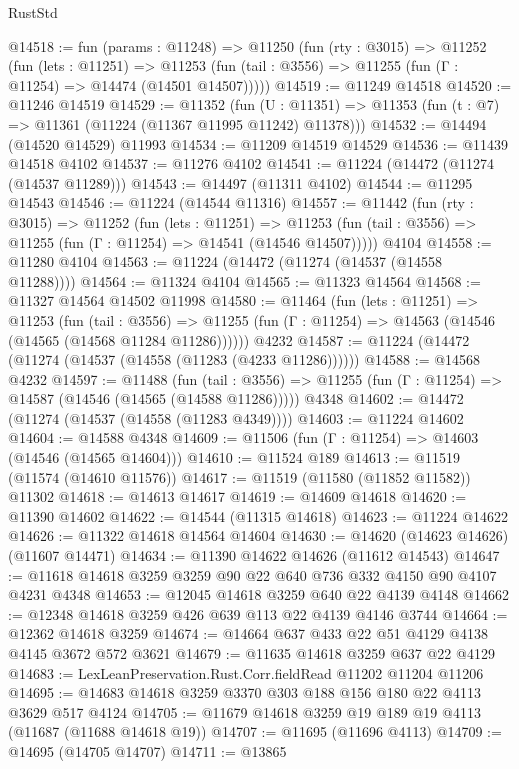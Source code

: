 \begin{lexlean}{RustStd}
\begin{coremodule}
@14518 := fun (params : @11248) =>
  @11250
    (fun (rty : @3015) =>
    @11252
      (fun (lets : @11251) =>
      @11253 (fun (tail : @3556) => @11255 (fun (Γ : @11254) => @14474 (@14501 @14507)))))
@14519 := @11249 @14518
@14520 := @11246 @14519
@14529 := @11352
    (fun (U : @11351) => @11353 (fun (t : @7) => @11361 (@11224 (@11367 @11995 @11242) @11378)))
@14532 := @14494 (@14520 @14529) @11993
@14534 := @11209 @14519 @14529
@14536 := @11439 @14518 @4102
@14537 := @11276 @4102
@14541 := @11224 (@14472 (@11274 (@14537 @11289)))
@14543 := @14497 (@11311 @4102)
@14544 := @11295 @14543
@14546 := @11224 (@14544 @11316)
@14557 := @11442
    (fun (rty : @3015) =>
    @11252
      (fun (lets : @11251) =>
      @11253 (fun (tail : @3556) => @11255 (fun (Γ : @11254) => @14541 (@14546 @14507)))))
    @4104
@14558 := @11280 @4104
@14563 := @11224 (@14472 (@11274 (@14537 (@14558 @11288))))
@14564 := @11324 @4104
@14565 := @11323 @14564
@14568 := @11327 @14564 @14502 @11998
@14580 := @11464
    (fun (lets : @11251) =>
    @11253
      (fun (tail : @3556) =>
      @11255 (fun (Γ : @11254) => @14563 (@14546 (@14565 (@14568 @11284 @11286))))))
    @4232
@14587 := @11224 (@14472 (@11274 (@14537 (@14558 (@11283 (@4233 @11286))))))
@14588 := @14568 @4232
@14597 := @11488
    (fun (tail : @3556) => @11255 (fun (Γ : @11254) => @14587 (@14546 (@14565 (@14588 @11286)))))
    @4348
@14602 := @14472 (@11274 (@14537 (@14558 (@11283 @4349))))
@14603 := @11224 @14602
@14604 := @14588 @4348
@14609 := @11506 (fun (Γ : @11254) => @14603 (@14546 (@14565 @14604)))
@14610 := @11524 @189
@14613 := @11519 (@11574 (@14610 @11576))
@14617 := @11519 (@11580 (@11852 @11582)) @11302
@14618 := @14613 @14617
@14619 := @14609 @14618
@14620 := @11390 @14602
@14622 := @14544 (@11315 @14618)
@14623 := @11224 @14622
@14626 := @11322 @14618 @14564 @14604
@14630 := @14620 (@14623 @14626) (@11607 @14471)
@14634 := @11390 @14622 @14626 (@11612 @14543)
@14647 := @11618 @14618 @3259 @3259 @90 @22 @640 @736 @332 @4150 @90 @4107 @4231 @4348
@14653 := @12045 @14618 @3259 @640 @22 @4139 @4148
@14662 := @12348 @14618 @3259 @426 @639 @113 @22 @4139 @4146 @3744
@14664 := @12362 @14618 @3259
@14674 := @14664 @637 @433 @22 @51 @4129 @4138 @4145 @3672 @572 @3621
@14679 := @11635 @14618 @3259 @637 @22 @4129
@14683 := LexLeanPreservation.Rust.Corr.fieldRead @11202 @11204 @11206
@14695 := @14683 @14618 @3259 @3370 @303 @188 @156 @180 @22 @4113 @3629 @517 @4124
@14705 := @11679 @14618 @3259 @19 @189 @19 @4113 (@11687 (@11688 @14618 @19))
@14707 := @11695 (@11696 @4113)
@14709 := @14695 (@14705 @14707)
@14711 := @13865

\end{coremodule}
\end{lexlean}
